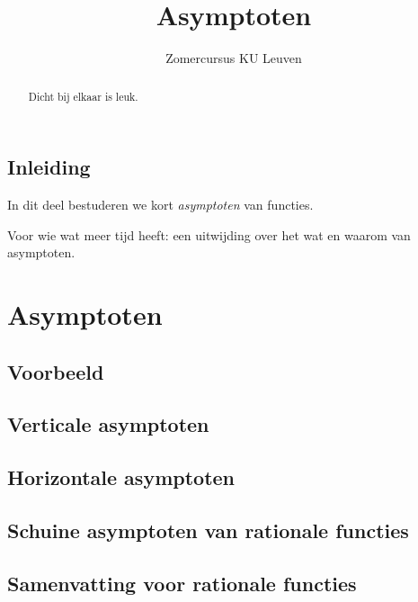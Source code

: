 \documentclass[numbers]{ximera}
\author{Zomercursus KU Leuven}
\title{Asymptoten}
\begin{document}
\begin{abstract}
	Dicht bij elkaar is leuk.
\end{abstract}
\maketitle

\subsection{Inleiding}
In dit deel bestuderen we kort \textit{asymptoten} van functies.


\begin{expandable}
Voor wie wat meer tijd heeft: een uitwijding over het wat en waarom van asymptoten.


\end{expandable}



\section{Asymptoten}
\subsection{Voorbeeld}
\subsection{Verticale asymptoten}
\subsection{Horizontale asymptoten}
\subsection{Schuine asymptoten van rationale functies}
\subsection{Samenvatting voor rationale functies}
\end{document}
